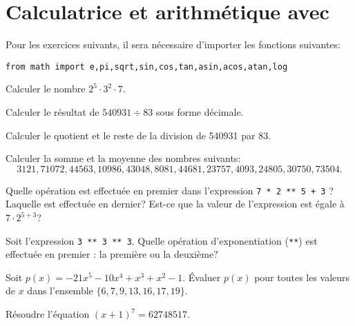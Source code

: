 
\section{Calculatrice et arithmétique avec \python}

Pour les exercices suivants, il sera nécessaire d'importer les fonctions
suivantes:
\begin{verbatim}
from math import e,pi,sqrt,sin,cos,tan,asin,acos,atan,log
\end{verbatim}

\begin{exercice}
Calculer le nombre $2^5\cdot 3^2\cdot 7$.
\end{exercice}

\begin{exercice}
Calculer le résultat de $540931 \div 83$ sous forme décimale.
\end{exercice}

\begin{exercice}
Calculer le quotient et le reste de la division de 540931 par 83.
\end{exercice}

\begin{exercice}
Calculer la somme et la moyenne des nombres suivants: 
\[
    3121, 71072, 44563, 10986, 43048, 8081, 44681, 23757, 4093, 24805, 30750,
    73504.
\]
\end{exercice}

\begin{exercice}
    Quelle opération est effectuée en premier dans l'expression
    \texttt{7 * 2 ** 5 + 3} ? Laquelle est effectuée en dernier?
    Est-ce que la valeur de l'expression est égale à $7\cdot 2^{5+3}$?
\end{exercice}

\begin{exercice}
    Soit l'expression \texttt{3 ** 3 ** 3}. 
    Quelle opération d'exponentiation (\texttt{**}) est effectuée en premier :
    la première ou la deuxième?
\end{exercice}

\begin{exercice}
    Soit $p(x)= -21x^{5} - 10x^{4} + x^{3} + x^{2} - 1$. Évaluer $p(x)$ pour
    toutes les valeurs de $x$ dans l'ensemble $\{6, 7, 9, 13, 16, 17, 19\}$.
\end{exercice}

\begin{exercice}
    Résoudre l'équation $(x+1)^7=62748517$.
\end{exercice}

